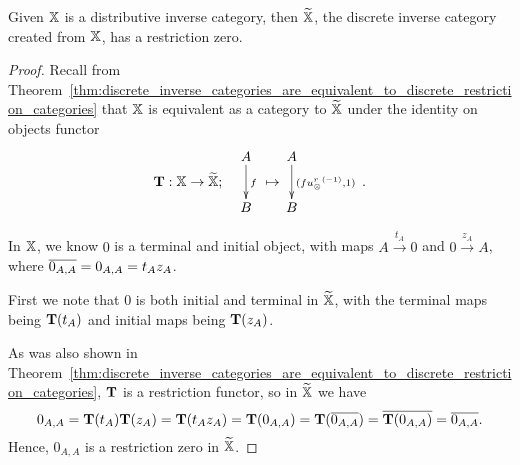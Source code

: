 \begin{lemma}\label{lem:x_tilde_has_a_restriction_zero}
  Given $\mathbb{X}$ is a distributive inverse category, then $\widetilde{\mathbb{X}}$, the discrete inverse category created
  from $\mathbb{X}$, has a restriction zero.
\end{lemma}
\begin{proof}
  Recall from Theorem~\ref{thm:discrete_inverse_categories_are_equivalent_to_discrete_restriction_categories}
  that $\mathbb{X}$ is equivalent as a category to $\widetilde{\mathbb{X}}$ under the identity on objects
  functor
  \[
    {\raisebox{-18pt}{$\wtf:\X \to \Xt;$}} \quad
    \xymatrix{A\ar[d]^{f}\\B}\ \raisebox{-18pt}{$\mapsto$}\, \xymatrix{A\ar[d]^{(f\inv{\usr},1)}\\B}
    \,\raisebox{-18pt}{.}
  \]

  In $\mathbb{X}$, we know $0$ is a terminal and initial object, with maps
  $A \xrightarrow{t_A} 0 $ and $0 \xrightarrow{z_A} A$, where  $\overline{0_{A,A}} = 0_{A,A} = t_A z_A$.

  First we note that $0$ is both initial and terminal in $\widetilde{\mathbb{X}}$, with the terminal maps being
  $\mathbf{T}(t_A)$ and initial maps being $\mathbf{T}(z_A)$.

  As was also shown in
  Theorem~\ref{thm:discrete_inverse_categories_are_equivalent_to_discrete_restriction_categories},
$\mathbf{T}$ is a restriction functor, so in $\widetilde{\mathbb{X}}$ we have
  \[
    0_{A,A} = \mathbf{T}(t_A)\mathbf{T}(z_A) = \mathbf{T}(t_A z_A) = \mathbf{T}(0_{A,A}) = \mathbf{T}(\overline{0_{A,A}}) =
    \overline{\mathbf{T}(0_{A,A})} = \overline{0_{A,A}}.
  \]
  Hence, $0_{A,A}$ is a restriction zero in $\widetilde{\mathbb{X}}$.
\end{proof}

